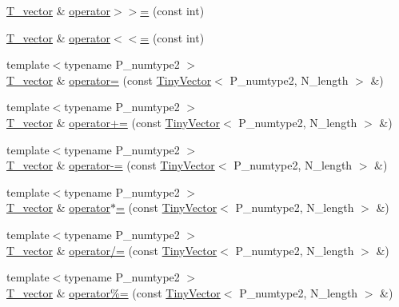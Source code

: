 \begin{DoxyCompactItemize}
\item 
\hyperlink{classTinyVector_aea08e4463006acf6842a93c026b27094}{T\+\_\+vector} \& \hyperlink{classTinyVector_ad9a55b7dd46cf06834f4effa800e01f4}{operator$>$$>$=} (const int)
\item 
\hyperlink{classTinyVector_aea08e4463006acf6842a93c026b27094}{T\+\_\+vector} \& \hyperlink{classTinyVector_aa10ca01be591e8aabfc77996f49473d5}{operator$<$$<$=} (const int)
\item 
{\footnotesize template$<$typename P\+\_\+numtype2 $>$ }\\\hyperlink{classTinyVector_aea08e4463006acf6842a93c026b27094}{T\+\_\+vector} \& \hyperlink{classTinyVector_a4ba4d2763955587d0fa2961869f88d5e}{operator=} (const \hyperlink{classTinyVector}{Tiny\+Vector}$<$ P\+\_\+numtype2, N\+\_\+length $>$ \&)
\item 
{\footnotesize template$<$typename P\+\_\+numtype2 $>$ }\\\hyperlink{classTinyVector_aea08e4463006acf6842a93c026b27094}{T\+\_\+vector} \& \hyperlink{classTinyVector_a6d60d30876ee08da97b043d9ce69a1f7}{operator+=} (const \hyperlink{classTinyVector}{Tiny\+Vector}$<$ P\+\_\+numtype2, N\+\_\+length $>$ \&)
\item 
{\footnotesize template$<$typename P\+\_\+numtype2 $>$ }\\\hyperlink{classTinyVector_aea08e4463006acf6842a93c026b27094}{T\+\_\+vector} \& \hyperlink{classTinyVector_a9f6cb4e232b5fa91ff2290bf58330a22}{operator-\/=} (const \hyperlink{classTinyVector}{Tiny\+Vector}$<$ P\+\_\+numtype2, N\+\_\+length $>$ \&)
\item 
{\footnotesize template$<$typename P\+\_\+numtype2 $>$ }\\\hyperlink{classTinyVector_aea08e4463006acf6842a93c026b27094}{T\+\_\+vector} \& \hyperlink{classTinyVector_a16ced326ca73b442947e4d768e9497fe}{operator$\ast$=} (const \hyperlink{classTinyVector}{Tiny\+Vector}$<$ P\+\_\+numtype2, N\+\_\+length $>$ \&)
\item 
{\footnotesize template$<$typename P\+\_\+numtype2 $>$ }\\\hyperlink{classTinyVector_aea08e4463006acf6842a93c026b27094}{T\+\_\+vector} \& \hyperlink{classTinyVector_a68e64f7b9703fbd45e095e643b273a1c}{operator/=} (const \hyperlink{classTinyVector}{Tiny\+Vector}$<$ P\+\_\+numtype2, N\+\_\+length $>$ \&)
\item 
{\footnotesize template$<$typename P\+\_\+numtype2 $>$ }\\\hyperlink{classTinyVector_aea08e4463006acf6842a93c026b27094}{T\+\_\+vector} \& \hyperlink{classTinyVector_a7030673413ce75ad52d9e5223ce413a8}{operator\%=} (const \hyperlink{classTinyVector}{Tiny\+Vector}$<$ P\+\_\+numtype2, N\+\_\+length $>$ \&)

\end{DoxyCompactItemize}
